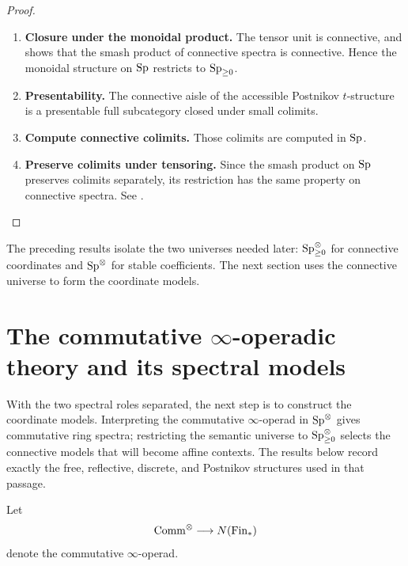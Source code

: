 \begin{proof}
\leavevmode
\begin{enumerate}[label=\textup{(\arabic*)}]
    \item \textbf{Closure under the monoidal product.}
    The tensor unit is connective, and
     shows that the smash product of
    connective spectra is connective. Hence the monoidal structure on
    \(\operatorname{Sp}\) restricts to \(\operatorname{Sp}_{\geq0}\).

    \item \textbf{Presentability.}
    The connective aisle of the accessible Postnikov \(t\)-structure is a
    presentable full subcategory closed under small colimits.

    \item \textbf{Compute connective colimits.}
    Those
    colimits are computed in \(\operatorname{Sp}\).

    \item \textbf{Preserve colimits under tensoring.}
    Since the smash product on \(\operatorname{Sp}\)
    preserves colimits separately, its restriction has the same property on
    connective spectra. See \cite{LurieHigherAlgebra}.
\end{enumerate}
\end{proof}

The preceding results isolate the two universes needed later:
\(\operatorname{Sp}_{\geq0}^\otimes\) for connective coordinates and \(\operatorname{Sp}^\otimes\) for
stable coefficients. The next section uses the connective universe to form
the coordinate models.

\section{The commutative \texorpdfstring{$\infty$}{infinity}-operadic theory and its spectral models}
\label{sec:commutative-operadic-spectral-algebra}

With the two spectral roles separated, the next step is to construct the
coordinate models. Interpreting the commutative \(\infty\)-operad in
\(\operatorname{Sp}^\otimes\) gives commutative ring spectra; restricting the semantic
universe to \(\operatorname{Sp}_{\geq0}^\otimes\) selects the connective models that will
become affine contexts. The results below record exactly the free,
reflective, discrete, and Postnikov structures used in that passage.

Let
\[
    \mathrm{Comm}^\otimes
    \longrightarrow
    N(\mathrm{Fin}_*)
\]
denote the commutative $\infty$-operad.

